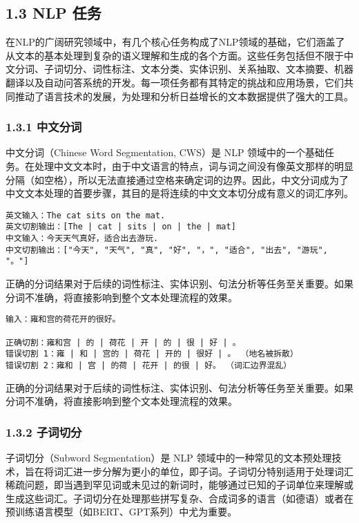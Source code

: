 \documentclass[
]{article}
\begin{document}
\subsection{1.3 NLP 任务}\label{nlp-ux4efbux52a1}

在NLP的广阔研究领域中，有几个核心任务构成了NLP领域的基础，它们涵盖了从文本的基本处理到复杂的语义理解和生成的各个方面。这些任务包括但不限于中文分词、子词切分、词性标注、文本分类、实体识别、关系抽取、文本摘要、机器翻译以及自动问答系统的开发。每一项任务都有其特定的挑战和应用场景，它们共同推动了语言技术的发展，为处理和分析日益增长的文本数据提供了强大的工具。

\subsubsection{1.3.1 中文分词}\label{ux4e2dux6587ux5206ux8bcd}

中文分词（Chinese Word Segmentation, CWS）是 NLP
领域中的一个基础任务。在处理中文文本时，由于中文语言的特点，词与词之间没有像英文那样的明显分隔（如空格），所以无法直接通过空格来确定词的边界。因此，中文分词成为了中文文本处理的首要步骤，其目的是将连续的中文文本切分成有意义的词汇序列。

\begin{verbatim}
英文输入：The cat sits on the mat.
英文切割输出：[The | cat | sits | on | the | mat]
中文输入：今天天气真好，适合出去游玩.
中文切割输出：["今天", "天气", "真", "好", "，", "适合", "出去", "游玩", "。"]
\end{verbatim}

正确的分词结果对于后续的词性标注、实体识别、句法分析等任务至关重要。如果分词不准确，将直接影响到整个文本处理流程的效果。

\begin{verbatim}
输入：雍和宫的荷花开的很好。

正确切割：雍和宫 | 的 | 荷花 | 开 | 的 | 很 | 好 | 。
错误切割 1：雍 | 和 | 宫的 | 荷花 | 开的 | 很好 | 。 （地名被拆散）
错误切割 2：雍和 | 宫 | 的荷 | 花开 | 的很 | 好。 （词汇边界混乱）
\end{verbatim}

正确的分词结果对于后续的词性标注、实体识别、句法分析等任务至关重要。如果分词不准确，将直接影响到整个文本处理流程的效果。

\subsubsection{1.3.2 子词切分}\label{ux5b50ux8bcdux5207ux5206}

子词切分（Subword Segmentation）是 NLP
领域中的一种常见的文本预处理技术，旨在将词汇进一步分解为更小的单位，即子词。子词切分特别适用于处理词汇稀疏问题，即当遇到罕见词或未见过的新词时，能够通过已知的子词单位来理解或生成这些词汇。子词切分在处理那些拼写复杂、合成词多的语言（如德语）或者在预训练语言模型（如BERT、GPT系列）中尤为重要。
\end{document}
